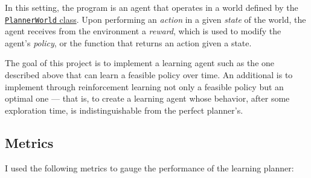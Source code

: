 \documentclass{article}
\begin{document}
In this setting, the program is an agent that operates in a world defined by the \hyperref[sec:plannerworld]{\texttt{PlannerWorld} class}. Upon performing an \textit{action} in a given \textit{state} of the world, the agent receives from the environment a \textit{reward}, which is used to modify the agent's \textit{policy}, or the function that returns an action given a state.

The goal of this project is to implement a learning agent such as the one described above that can learn a feasible policy over time. An additional is to implement through reinforcement learning not only a feasible policy but an optimal one --- that is, to create a learning agent whose behavior, after some exploration time, is indistinguishable from the perfect planner's. 


\subsection{Metrics}
\label{sec:metrics}

I used the following metrics to gauge the performance of the learning planner:
\end{document}
